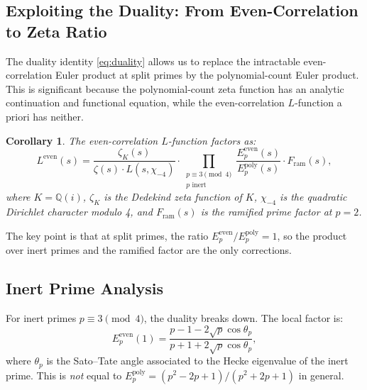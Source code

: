\documentclass[11pt,a4paper]{article}
\theoremstyle{plain}
\newtheorem{corollary}[theorem]{Corollary}
\theoremstyle{definition}
\newcommand{\QQ}{\mathbb{Q}}
\begin{document}
\subsection{Exploiting the Duality: From Even-Correlation to Zeta Ratio}

The duality identity \eqref{eq:duality} allows us to replace the intractable even-correlation Euler product at split primes by the polynomial-count Euler product. This is significant because the polynomial-count zeta function has an analytic continuation and functional equation, while the even-correlation $L$-function a priori has neither.

\begin{corollary}
\label{cor:zeta-ratio}
The even-correlation $L$-function factors as:
\begin{equation}
\label{eq:zeta-ratio}
L^{\mathrm{even}}(s) = \frac{\zeta_{K}(s)}{\zeta(s) \cdot L(s, \chi_{-4})} \cdot \prod_{\substack{p \equiv 3 \!\!\!\pmod{4} \\ p \text{ inert}}} \frac{E_p^{\mathrm{even}}(s)}{E_p^{\mathrm{poly}}(s)} \cdot F_{\mathrm{ram}}(s),
\end{equation}
where $K = \QQ(i)$, $\zeta_K$ is the Dedekind zeta function of $K$, $\chi_{-4}$ is the quadratic Dirichlet character modulo 4, and $F_{\mathrm{ram}}(s)$ is the ramified prime factor at $p = 2$.
\end{corollary}

The key point is that at split primes, the ratio $E_p^{\mathrm{even}} / E_p^{\mathrm{poly}} = 1$, so the product over inert primes and the ramified factor are the only corrections.

\subsection{Inert Prime Analysis}

For inert primes $p \equiv 3 \pmod{4}$, the duality breaks down. The local factor is:
\begin{equation}
\label{eq:inert-factor}
E_p^{\mathrm{even}}(1) = \frac{p - 1 - 2\sqrt{p}\cos\theta_p}{p + 1 + 2\sqrt{p}\cos\theta_p},
\end{equation}
where $\theta_p$ is the Sato--Tate angle associated to the Hecke eigenvalue of the inert prime. This is \emph{not} equal to $E_p^{\mathrm{poly}} = (p^2 - 2p + 1)/(p^2 + 2p + 1)$ in general.
\end{document}
